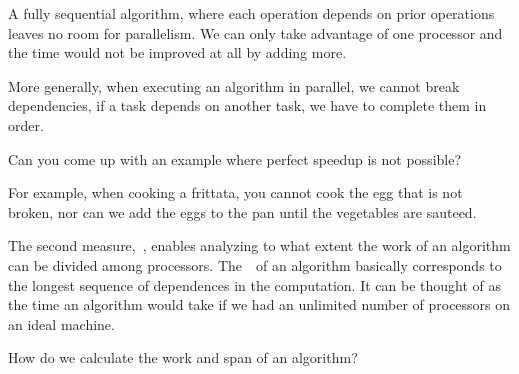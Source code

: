 \begin{example}
A fully sequential algorithm, where each operation depends on prior
operations leaves no room for parallelism.
%
We can only take advantage of one processor and the time would not be
improved at all by adding more.  
%

More generally, when executing an algorithm in parallel, we cannot
break dependencies, if a task depends on another task, we have to
complete them in order.
\end{example}


\begin{teachask}
Can you come up with an example where perfect speedup is not possible?
\end{teachask}
%

\begin{teachnote}
For example, when cooking a frittata, you cannot cook the egg that is
not broken, nor can we add the eggs to the pan until the vegetables
are sauteed.
\end{teachnote}

\begin{gram}[Span]
The second measure,~, enables analyzing to what extent the
work of an algorithm can be divided among processors.
The~~of an algorithm basically corresponds to the longest
sequence of dependences in the computation.  It can be thought of as
the time an algorithm would take if we had an unlimited number of
processors on an ideal machine.
\end{gram}
%


\begin{teachask}
How do we calculate the work and span of an algorithm?
\end{teachask}

